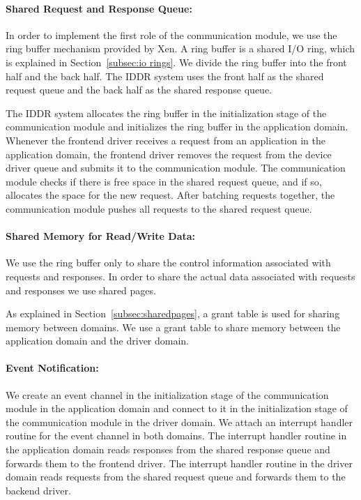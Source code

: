 \paragraph{Shared Request and Response Queue:}
In order to implement the first role of the communication module, we
use the ring buffer mechanism provided by Xen. A ring buffer is a shared
I/O ring, which is explained in Section~\ref{subsec:io rings}. We divide
the ring buffer into the front half and the back half. The IDDR system
uses the front half as the shared request queue and the back half as
the shared response queue. 

The IDDR system allocates the ring buffer in the initialization stage
of the communication module and initializes the ring buffer in the
application domain. Whenever the frontend driver receives a request from
an application in the application domain, the frontend driver removes the
request from the device driver queue and submits it to the communication
module. The communication module checks if there is free space in the shared
request queue, and if so, allocates the space for the new
request. After batching requests together, the communication module
pushes all requests to the shared request queue.

\paragraph{Shared Memory for Read/Write Data:}
We use the ring buffer only to share the control information associated with 
requests and responses. In order to share the actual data associated with 
requests and responses we use shared pages.

As explained in Section~\ref{subsec:sharedpages}, a grant table is used
for sharing memory between domains. We use a grant table to share memory
between the application domain and the driver domain.

\paragraph{Event Notification:}
We create an event channel in the initialization stage of the
communication module in the application domain and connect to it in 
the initialization stage of the communication module
in the driver domain. We attach an interrupt handler routine for the
event channel in both domains. The interrupt handler routine in the 
application domain reads responses from the shared
response queue and forwards them to the frontend driver. The interrupt
handler routine in the driver domain reads requests from the shared
request queue and forwards them to the backend driver.

